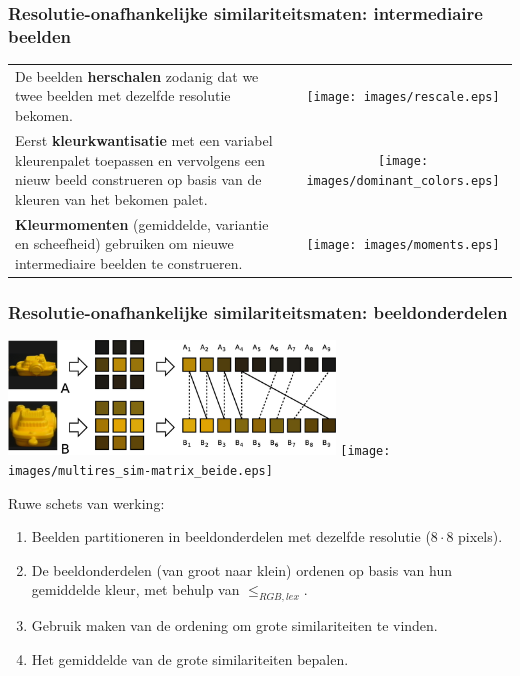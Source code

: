 \documentclass[dutch]{beamer}
\theoremstyle{definition}
\theoremstyle{remark}
\theoremstyle{example}
\begin{document}
{
  \frametitle{Resolutie-onafhankelijke similariteitsmaten: intermediaire beelden}

  \begin{center}
  \begin{tabular}{@{}lc@{}}
  \begin{minipage}{0.6\textwidth}
  De beelden \textbf{herschalen} zodanig dat we twee beelden met dezelfde resolutie bekomen. 
  \end{minipage} & 
  \begin{minipage}{0.4\textwidth}
  \texttt{[image: images/rescale.eps]}
  \end{minipage}\vspace{5pt}\\
  \begin{minipage}{0.6\textwidth}
  Eerst \textbf{kleurkwantisatie} met een variabel kleurenpalet toepassen en vervolgens een
  nieuw beeld construeren op basis van de kleuren van het bekomen palet.
  \end{minipage} &
  \begin{minipage}{0.4\textwidth}
  \texttt{[image: images/dominant\_colors.eps]}
  \end{minipage}\vspace{5pt}\\
  \begin{minipage}{0.6\textwidth}
  \textbf{Kleurmomenten} (gemiddelde, variantie en scheefheid) gebruiken om nieuwe 
  intermediaire beelden te construeren.
  \end{minipage} &
  \begin{minipage}{0.4\textwidth}
  \texttt{[image: images/moments.eps]}
  \end{minipage}
  \end{tabular}
  \end{center}
}
\frame
{
  \frametitle{Resolutie-onafhankelijke similariteitsmaten: beeldonderdelen}
  
  \begin{minipage}{\textwidth}
  \centering
  \includegraphics[width=0.65\textwidth]{images/multires.eps}\qquad
  \texttt{[image: images/multires\_sim-matrix\_beide.eps]}
  \vspace{4pt}
  \end{minipage}
  Ruwe schets van werking:
  \begin{enumerate}
    \item Beelden partitioneren in beeldonderdelen met dezelfde resolutie 
    ($8 \cdot 8$ pixels).
    \item De beeldonderdelen (van groot naar klein) ordenen op basis van
    hun gemiddelde kleur, met behulp van $\le_{RGB,lex}$.
    \item Gebruik maken van de ordening om grote similariteiten te vinden.
    \item Het gemiddelde van de grote similariteiten bepalen.
  \end{enumerate}
}
\end{document}
